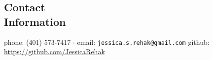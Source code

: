 \documentclass[margin,line]{resume}
\begin{document}
\begin{resume}
  \section{\mysidestyle Contact\\Information}
  phone: (401) 573-7417 $\cdot$ email: \verb`jessica.s.rehak@gmail.com`\newline
  github: \url{https://github.com/JessicaRehak}\hfill \\


\end{resume}
\end{document}

